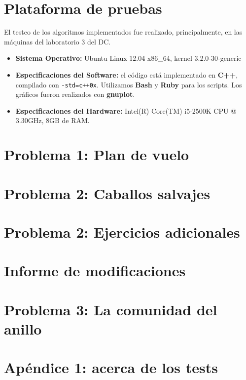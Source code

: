 \documentclass[a4paper]{article}
\begin{document}
\section{Plataforma de pruebas}
El testeo de los algoritmos implementados fue realizado, principalmente, en las máquinas del laboratorio 3 del DC. \newline
\begin{itemize}
  \item \textbf{Sistema Operativo:} Ubuntu Linux 12.04 x86_64, kernel 3.2.0-30-generic

  \item \textbf{Especificaciones del Software:} el código está implementado en \textbf{C++}, compilado con \verb|-std=c++0x|.
  Utilizamos \textbf{Bash} y \textbf{Ruby} para los scripts. Los gráficos fueron realizados con \textbf{gnuplot}.

  \item \textbf{Especificaciones del Hardware:} Intel(R) Core(TM) i5-2500K CPU @ 3.30GHz, 8GB de RAM.
\end{itemize}




\newpage
\section{Problema 1: Plan de vuelo}



\newpage
\section{Problema 2: Caballos salvajes}



\newpage
\section{Problema 2: Ejercicios adicionales}



\newpage
\section{Informe de modificaciones}



\newpage
\section{Problema 3: La comunidad del anillo}




\newpage
\section{Apéndice 1: acerca de los tests}
\end{document}
